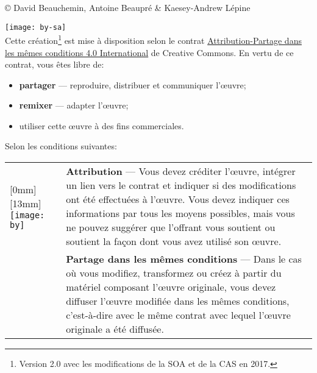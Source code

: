 \small
{\copyright} {\the\year} David Beauchemin, Antoine Beaupré \& Kaesey-Andrew Lépine \\

\vspace{\baselineskip}

\texttt{[image: by-sa]}\\%
Cette création\footnote{Version 2.0 avec les modifications de la SOA et de la CAS en 2017.} est mise à disposition selon le contrat
\href{http://creativecommons.org/licenses/by-sa/4.0/deed.fr}{%
  Attribution-Partage dans les mêmes conditions 4.0 International} de
Creative Commons. En vertu de ce contrat, vous êtes libre de:
\begin{itemize}
\item \textbf{partager} --- reproduire, distribuer et communiquer
  l'{\oe}uvre;
\item \textbf{remixer} --- adapter l'{\oe}uvre;
\item utiliser cette {\oe}uvre à des fins commerciales.
\end{itemize}
Selon les conditions suivantes:

\begin{tabularx}{\linewidth}{@{}lX@{}}
  \raisebox{-9mm}[0mm][13mm]{%
    \texttt{[image: by]}} &
  \textbf{Attribution} --- Vous devez créditer l'{\oe}uvre, intégrer
  un lien vers le contrat et indiquer si des modifications ont été
  effectuées à l'{\oe}uvre. Vous devez indiquer ces informations par
  tous les moyens possibles, mais vous ne pouvez suggérer que
  l'offrant vous soutient ou soutient la façon dont vous avez utilisé
  son {\oe}uvre. \\
  \raisebox{-9mm}{\texttt{[image: sa]}}
  & \textbf{Partage dans les mêmes conditions} --- Dans le cas où vous
  modifiez, transformez ou créez à partir du matériel composant
  l'{\oe}uvre originale, vous devez diffuser l'{\oe}uvre modifiée dans
  les mêmes conditions, c'est-à-dire avec le même contrat avec lequel
  l'{\oe}uvre originale a été diffusée.
\end{tabularx}

